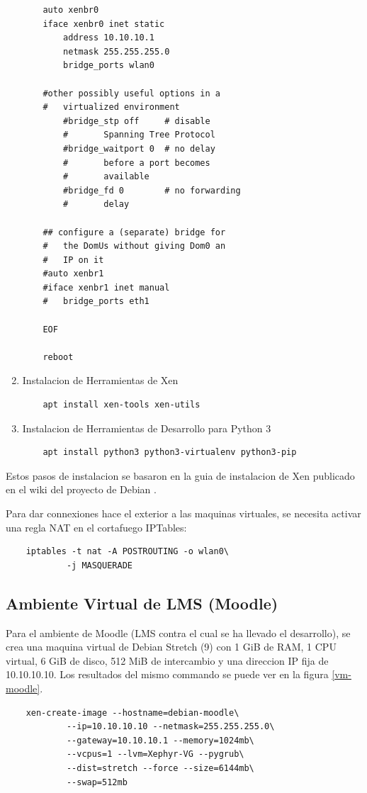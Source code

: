 \begin{enumerate}
\begin{lstlisting}
	auto xenbr0
	iface xenbr0 inet static
		address 10.10.10.1
		netmask 255.255.255.0
		bridge_ports wlan0

	#other possibly useful options in a
	#	virtualized environment
		#bridge_stp off		# disable
		#		Spanning Tree Protocol
		#bridge_waitport 0	# no delay
		#		before a port becomes
		#		available
		#bridge_fd 0		# no forwarding
		#		delay

	## configure a (separate) bridge for
	#	the DomUs without giving Dom0 an
	#	IP on it
	#auto xenbr1
	#iface xenbr1 inet manual
	#   bridge_ports eth1

	EOF

	reboot
		\end{lstlisting}
	\item Instalacion de Herramientas de Xen
		\begin{lstlisting}
	apt install xen-tools xen-utils
		\end{lstlisting}
    \item Instalacion de Herramientas de Desarrollo para Python 3
    	\begin{lstlisting}
	apt install python3 python3-virtualenv python3-pip
    	\end{lstlisting}
\end{enumerate}

Estos pasos de instalacion se basaron en la guia de instalacion de Xen publicado en el wiki del proyecto de Debian \citep{Debian-Wiki-Xen}.

Para dar connexiones hace el exterior a las maquinas virtuales, se necesita activar una regla NAT en el cortafuego IPTables:

\begin{lstlisting}
	iptables -t nat -A POSTROUTING -o wlan0\
    		-j MASQUERADE
\end{lstlisting}

\subsection{Ambiente Virtual de LMS (Moodle)}
\label{instalacion-moodle}

Para el ambiente de Moodle (LMS contra el cual se ha llevado el desarrollo), se crea una maquina virtual de Debian Stretch (9) con 1 GiB de RAM, 1 CPU virtual, 6 GiB de disco, 512 MiB de intercambio y una direccion IP fija de 10.10.10.10. Los resultados del mismo commando se puede ver en la figura \ref{vm-moodle}.
\begin{lstlisting}
	xen-create-image --hostname=debian-moodle\
    		--ip=10.10.10.10 --netmask=255.255.255.0\
        	--gateway=10.10.10.1 --memory=1024mb\
        	--vcpus=1 --lvm=Xephyr-VG --pygrub\
        	--dist=stretch --force --size=6144mb\
        	--swap=512mb
\end{lstlisting}


